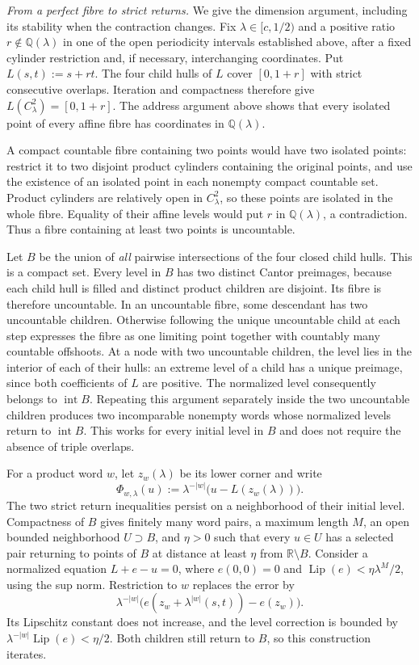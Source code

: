 \par\medskip\noindent\emph{From a perfect fibre to strict returns.}
We give the dimension argument, including its stability when the contraction
changes. Fix $\lambda\in[c,1/2)$ and a positive ratio
$r\notin\mathbb Q(\lambda)$ in one of the open periodicity intervals
established above, after a fixed cylinder restriction and, if necessary,
interchanging coordinates. Put $L(s,t):=s+rt$.
The four child hulls of $L$ cover $[0,1+r]$ with strict consecutive
overlaps. Iteration and compactness therefore give
$L(C_\lambda^2)=[0,1+r]$.
The address argument above shows that every isolated point of every affine
fibre has coordinates in $\mathbb Q(\lambda)$.

A compact countable fibre containing two points would have two isolated
points: restrict it to two disjoint product cylinders containing the
original points, and use the existence of an isolated point in each
nonempty compact countable set. Product cylinders are relatively open
in $C_\lambda^2$, so these points are isolated in the whole fibre.
Equality of their affine levels would put $r$ in $\mathbb Q(\lambda)$,
a contradiction. Thus a fibre containing at least two points is uncountable.

Let $B$ be the union of \emph{all} pairwise intersections of the four
closed child hulls. This is a compact set. Every level in $B$ has two
distinct Cantor preimages, because each child hull is filled and distinct
product children are disjoint. Its fibre is therefore uncountable.
In an uncountable fibre, some descendant has two uncountable children.
Otherwise following the unique uncountable child at each step expresses
the fibre as one limiting point together with countably many countable
offshoots. At a node with two uncountable children, the level lies in the
interior of each of their hulls: an extreme level of a child has a unique
preimage, since both coefficients of $L$ are positive. The normalized
level consequently belongs to $\operatorname{int}B$.
Repeating this argument separately inside the two uncountable children
produces two incomparable nonempty words whose normalized levels return
to $\operatorname{int}B$. This works for every initial level in $B$ and
does not require the absence of triple overlaps.

For a product word $w$, let $z_w(\lambda)$ be its lower corner and write
\[
 \Phi_{w,\lambda}(u)
 :=\lambda^{-|w|}\bigl(u-L(z_w(\lambda))\bigr).
\]
The two strict return inequalities persist on a neighborhood of their
initial level. Compactness of $B$ gives finitely many word pairs, a maximum
length $M$, an open bounded neighborhood $U\supset B$, and $\eta>0$ such
that every $u\in U$ has a selected pair returning to points of $B$ at
distance at least $\eta$ from $\mathbb R\setminus B$.
Consider a normalized equation $L+e-u=0$, where $e(0,0)=0$ and
$\operatorname{Lip}(e)<\eta\lambda^M/2$, using the sup norm.
Restriction to $w$ replaces the error by
\[
 \lambda^{-|w|}
 \bigl(e(z_w+\lambda^{|w|}(s,t))-e(z_w)\bigr).
\]
Its Lipschitz constant does not increase, and the level correction is
bounded by $\lambda^{-|w|}\operatorname{Lip}(e)<\eta/2$.
Both children still return to $B$, so this construction iterates.

